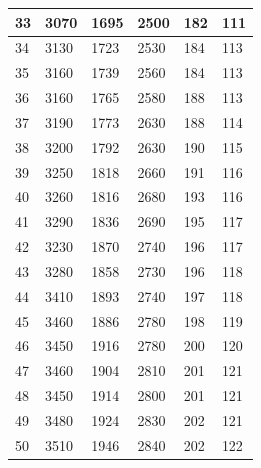 \documentclass[a4paper]{ltxdoc}
\begin{document}
{\begin{longtable}{|l|l|l|l|l|l|}
        33  & 3070          & 1695          & 2500          & 182           & 111           \\ \hline
        34  & 3130          & 1723          & 2530          & 184           & 113           \\ \hline
        35  & 3160          & 1739          & 2560          & 184           & 113           \\ \hline
        36  & 3160          & 1765          & 2580          & 188           & 113           \\ \hline
        37  & 3190          & 1773          & 2630          & 188           & 114           \\ \hline
        38  & 3200          & 1792          & 2630          & 190           & 115           \\ \hline
        39  & 3250          & 1818          & 2660          & 191           & 116           \\ \hline
        40  & 3260          & 1816          & 2680          & 193           & 116           \\ \hline
        41  & 3290          & 1836          & 2690          & 195           & 117           \\ \hline
        42  & 3230          & 1870          & 2740          & 196           & 117           \\ \hline
        43  & 3280          & 1858          & 2730          & 196           & 118           \\ \hline
        44  & 3410          & 1893          & 2740          & 197           & 118           \\ \hline
        45  & 3460          & 1886          & 2780          & 198           & 119           \\ \hline
        46  & 3450          & 1916          & 2780          & 200           & 120           \\ \hline
        47  & 3460          & 1904          & 2810          & 201           & 121           \\ \hline
        48  & 3450          & 1914          & 2800          & 201           & 121           \\ \hline
        49  & 3480          & 1924          & 2830          & 202           & 121           \\ \hline
        50  & 3510          & 1946          & 2840          & 202           & 122           \\ \hline
    \end{longtable}}
\end{document}
